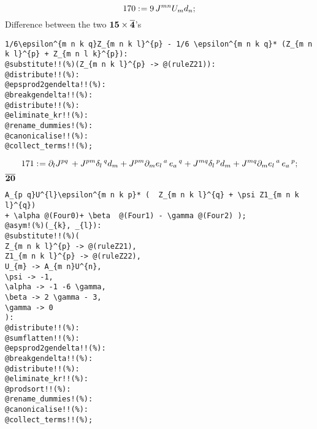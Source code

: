 \documentclass[11pt]{article}
\def\specialcolon{\mathrel{\mathop{:}}\hspace{-.5em}}
\renewcommand{\bar}[1]{\overline{#1}}
\begin{document}
\begin{dmath*}[compact, spread=2pt]
170\specialcolon{}= 9\, {J}^{m n} {U}_{m} {d}_{n};
\end{dmath*}
Difference between the two $\bf 15 \times \bar{4}$'s
{\color[named]{Blue}\begin{verbatim}
1/6\epsilon^{m n k q}Z_{m n k l}^{p} - 1/6 \epsilon^{m n k q}* (Z_{m n k l}^{p} + Z_{m n l k}^{p}):
@substitute!!(%)(Z_{m n k l}^{p} -> @(ruleZ21)):
@distribute!!(%):
@epsprod2gendelta!!(%):
@breakgendelta!!(%):
@distribute!!(%):
@eliminate_kr!!(%):
@rename_dummies!(%):
@canonicalise!!(%):
@collect_terms!!(%);
\end{verbatim}}


\begin{dmath*}[compact, spread=2pt]
171\specialcolon{}= {\partial}_{l}{{J}^{p q}}\,  + {J}^{p m} {\delta}_{l}\,^{q} {d}_{m} + {J}^{p m} {\partial}_{m}{{e}_{l}\,^{a}}\,  {e}_{a}\,^{q} + {J}^{m q} {\delta}_{l}\,^{p} {d}_{m} + {J}^{m q} {\partial}_{m}{{e}_{l}\,^{a}}\,  {e}_{a}\,^{p};
\end{dmath*}
$\bf \overline{20}$
{\color[named]{Blue}\begin{verbatim}
A_{p q}U^{l}\epsilon^{m n k p}* (  Z_{m n k l}^{q} + \psi Z1_{m n k l}^{q}) 
+ \alpha @(Four0)+ \beta  @(Four1) - \gamma @(Four2) );
@asym!(%)(_{k}, _{l}):
@substitute!!(%)(
Z_{m n k l}^{p} -> @(ruleZ21),
Z1_{m n k l}^{p} -> @(ruleZ22),
U_{m} -> A_{m n}U^{n},
\psi -> -1,
\alpha -> -1 -6 \gamma,
\beta -> 2 \gamma - 3,
\gamma -> 0
):
@distribute!!(%):
@sumflatten!!(%):
@epsprod2gendelta!!(%):
@breakgendelta!!(%):
@distribute!!(%):
@eliminate_kr!!(%):
@prodsort!!(%):
@rename_dummies!(%):
@canonicalise!!(%):
@collect_terms!!(%);
\end{verbatim}}
\end{document}

